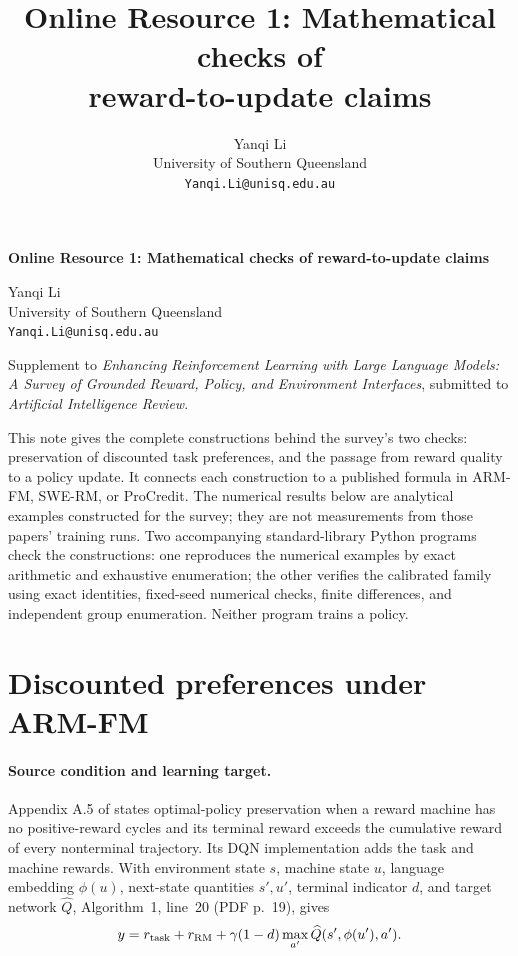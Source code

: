 \documentclass[11pt]{article}
\title{Online Resource 1: Mathematical checks of\protect\\ reward-to-update claims}
\author{Yanqi Li\\University of Southern Queensland\\\texttt{Yanqi.Li@unisq.edu.au}}
\date{}
\begin{document}
\begin{center}
{\large\bfseries Online Resource 1: Mathematical checks of reward-to-update claims}\par
\vspace{7pt}
Yanqi Li\\University of Southern Queensland\\\texttt{Yanqi.Li@unisq.edu.au}
\end{center}

Supplement to \emph{Enhancing Reinforcement Learning with Large Language Models: A Survey of Grounded Reward, Policy, and Environment Interfaces}, submitted to \emph{Artificial Intelligence Review}.

This note gives the complete constructions behind the survey's two checks: preservation of discounted task preferences, and the passage from reward quality to a policy update. It connects each construction to a published formula in ARM-FM, SWE-RM, or ProCredit. The numerical results below are analytical examples constructed for the survey; they are not measurements from those papers' training runs. Two accompanying standard-library Python programs check the constructions: one reproduces the numerical examples by exact arithmetic and exhaustive enumeration; the other verifies the calibrated family using exact identities, fixed-seed numerical checks, finite differences, and independent group enumeration. Neither program trains a policy.

\section{Discounted preferences under ARM-FM}
\label{sec:arm}

\paragraph{Source condition and learning target.}
Appendix A.5 of \citet{Castanyer2026ARMFM} states optimal-policy preservation when a reward machine has no positive-reward cycles and its terminal reward exceeds the cumulative reward of every nonterminal trajectory. Its DQN implementation adds the task and machine rewards. With environment state $s$, machine state $u$, language embedding $\phi(u)$, next-state quantities $s',u'$, terminal indicator $d$, and target network $\widehat Q$, Algorithm~1, line~20 (PDF p.~19), gives
\begin{equation}
y=r_{\rm task}+r_{\rm RM}
  +\gamma(1-d)\max_{a'}\widehat Q(s',\phi(u'),a').
\label{eq:dqn}
\end{equation}
\end{document}
